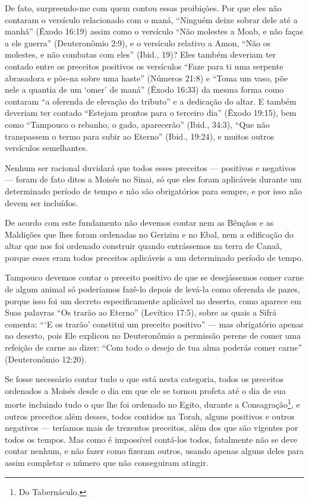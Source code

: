 De fato, surpreendo-me com quem contou essas proibições. Por que eles
não contaram o versículo relacionado com o maná, ``Ninguém deixe sobrar
dele até a manhã'' (Êxodo 16:19) assim como o versículo ``Não molestes a
Moab, e não faças a ele guerra'' (Deuteronômio 2:9), e o versículo
relativo a Amon, ``Não os molestes, e não combatas com eles'' (Ibid.,
19)? Eles também deveriam ter contado entre os preceitos positivos os
versículos ``Faze para ti uma serpente abrasadora e põe-na sobre uma
haste'' (Números 21:8) e ``Toma um vaso, põe nele a quantia de um `omer'
de maná'' (Êxodo 16:33) da mesma forma como contaram
``a oferenda de elevação do tributo'' e a dedicação do altar. E também
deveriam ter contado ``Estejam prontos para o terceiro dia'' (Êxodo
19:15), bem como ``Tampouco o rebanho, o gado, aparecerão'' (Ibid.,
34:3), ``Que não transpassem o termo para subir ao Eterno'' (Ibid.,
19:24), e muitos outros versículos semelhantes.

Nenhum ser racional duvidará que todos esses preceitos --- positivos e
negativos --- foram de fato ditos a Moisés no Sinai, só que eles foram
aplicáveis durante um determinado período de tempo e não são
obrigatórios para sempre, e por isso não devem ser incluídos.

De acordo com este fundamento não devemos contar nem as Bênçãos e as Maldições que lhes foram ordenadas no Gerizim e no Ebal, nem a
edificação do altar que nos foi ordenado construir quando entrássemos
na terra de Canaã, porque esses eram todos preceitos aplicáveis a um
determinado período de tempo.

Tampouco devemos contar o preceito positivo de que se desejássemos
comer carne de algum animal só poderíamos fazê-lo depois de levá-la
como oferenda de pazes, porque isso foi um decreto especificamente
aplicável no deserto, como aparece em Suas palavras ``Os trarão ao
Eterno'' (Levítico 17:5), sobre as quais a Sifrá comenta: ```E os
trarão' constitui um preceito positivo'' --- mas obrigatório apenas no
deserto, pois Ele explicou no Deuteronômio a permissão perene de comer
uma refeição de carne ao dizer: ``Com todo o desejo de tua alma poderás
comer carne'' (Deuteronômio 12:20).

Se fosse necessário contar tudo o que está nesta categoria, todos os
preceitos ordenados a Moisés desde o dia em que ele se tornou profeta
até o dia de sua morte incluindo tudo o que lhe foi ordenado no Egito,
durante a Consagração\footnote{Do Tabernáculo.}, e outros preceitos além
desses, todos contidos na Torah, alguns positivos e outros negativos
--- teríamos mais de trezentos preceitos, além dos que são vigentes por
todos os tempos. Mas como é impossível contá-los todos, fatalmente não
se deve contar nenhum, e não fazer como fizeram outros, usando apenas
alguns deles para assim completar o número que não conseguiram atingir.

